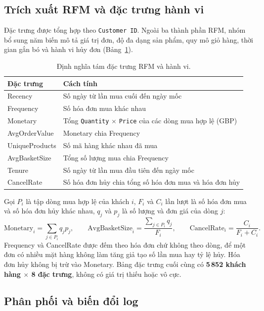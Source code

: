 \documentclass[../report.tex]{subfiles}
\begin{document}
\subsection{Trích xuất RFM và đặc trưng hành vi}

Đặc trưng được tổng hợp theo \texttt{Customer ID}. Ngoài ba thành phần RFM, nhóm bổ sung năm biến mô tả giá trị đơn, độ đa dạng sản phẩm, quy mô giỏ hàng, thời gian gắn bó và hành vi hủy đơn (Bảng~\ref{tab:features}).

\begin{table}[H]
\centering
\small
\begin{tabularx}{\textwidth}{@{}l X@{}}
\toprule
\textbf{Đặc trưng} & \textbf{Cách tính} \\
\midrule
Recency & Số ngày từ lần mua cuối đến ngày mốc \\
Frequency & Số hóa đơn mua khác nhau \\
Monetary & Tổng \texttt{Quantity} $\times$ \texttt{Price} của các dòng mua hợp lệ (GBP) \\
AvgOrderValue & Monetary chia Frequency \\
UniqueProducts & Số mã hàng khác nhau đã mua \\
AvgBasketSize & Tổng số lượng mua chia Frequency \\
Tenure & Số ngày từ lần mua đầu tiên đến ngày mốc \\
CancelRate & Số hóa đơn hủy chia tổng số hóa đơn mua và hóa đơn hủy \\
\bottomrule
\end{tabularx}
\caption{Định nghĩa tám đặc trưng RFM và hành vi.}
\label{tab:features}
\end{table}

Gọi $P_i$ là tập dòng mua hợp lệ của khách $i$, $F_i$ và $C_i$ lần lượt là số hóa đơn mua và số hóa đơn hủy khác nhau, $q_j$ và $p_j$ là số lượng và đơn giá của dòng $j$:
\begin{equation}
\mathrm{Monetary}_i = \sum_{j \in P_i} q_j p_j, \qquad
\mathrm{AvgBasketSize}_i = \frac{\sum_{j \in P_i} q_j}{F_i}, \qquad
\mathrm{CancelRate}_i = \frac{C_i}{F_i + C_i}.
\end{equation}
Frequency và CancelRate được đếm theo hóa đơn chứ không theo dòng, để một đơn có nhiều mặt hàng không làm tăng giả tạo số lần mua hay tỷ lệ hủy. Hóa đơn hủy không bị trừ vào Monetary. Bảng đặc trưng cuối cùng có \textbf{5\,852 khách hàng $\times$ 8 đặc trưng}, không có giá trị thiếu hoặc vô cực.

\subsection{Phân phối và biến đổi log}
\end{document}
